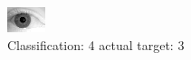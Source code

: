 \begin{figure}[h!]
\begin{center}
\includegraphics[width=0.60\columnwidth]{figures/ID2135_class_4_target_3.png}
\end{center}
\caption{ Classification: 4 actual target: 3}
\label{fig:ID2135_class_4_target_3}
\end{figure}
